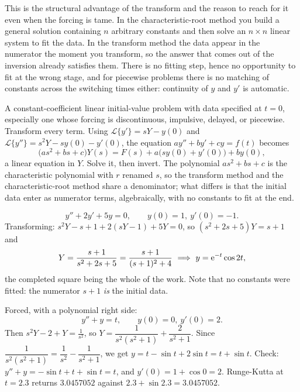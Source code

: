 \begin{keynote}
This is the structural advantage of the transform and the reason to reach for it even when the forcing is tame. In the characteristic-root method you build a general solution containing $n$ arbitrary constants and then solve an $n\times n$ linear system to fit the data. In the transform method the data appear in the numerator the moment you transform, so the answer that comes out of the inversion already satisfies them. There is no fitting step, hence no opportunity to fit at the wrong stage, and for piecewise problems there is no matching of constants across the switching times either: continuity of $y$ and $y'$ is automatic.
\end{keynote}

\cue A constant-coefficient linear initial-value problem with data specified at $t=0$, especially one whose forcing is discontinuous, impulsive, delayed, or piecewise.
\method Transform every term. Using $\mathcal{L}\{y'\}=sY-y(0)$ and $\mathcal{L}\{y''\}=s^{2}Y-sy(0)-y'(0)$, the equation $ay''+by'+cy=f(t)$ becomes
\[\bigl(as^{2}+bs+c\bigr)Y(s)=F(s)+a\bigl(sy(0)+y'(0)\bigr)+by(0),\]
a linear equation in $Y$. Solve it, then invert. The polynomial $as^{2}+bs+c$ is the characteristic polynomial with $r$ renamed $s$, so the transform method and the characteristic-root method share a denominator; what differs is that the initial data enter as numerator terms, algebraically, with no constants to fit at the end.

\begin{worked}
\[y''+2y'+5y=0,\qquad y(0)=1,\ y'(0)=-1.\]
Transforming: $s^{2}Y-s+1+2(sY-1)+5Y=0$, so $(s^{2}+2s+5)Y=s+1$ and
\[Y=\frac{s+1}{s^{2}+2s+5}=\frac{s+1}{(s+1)^{2}+4}\ \Longrightarrow\ y=\eu^{-t}\cos2t,\]
the completed square being the whole of the work. Note that no constants were fitted: the numerator $s+1$ \emph{is} the initial data.

Forced, with a polynomial right side:
\[y''+y=t,\qquad y(0)=0,\ y'(0)=2.\]
Then $s^{2}Y-2+Y=\tfrac1{s^{2}}$, so $Y=\dfrac{1}{s^{2}(s^{2}+1)}+\dfrac{2}{s^{2}+1}$. Since $\dfrac{1}{s^{2}(s^{2}+1)}=\dfrac1{s^{2}}-\dfrac1{s^{2}+1}$, we get $y=t-\sin t+2\sin t=t+\sin t$. Check: $y''+y=-\sin t+t+\sin t=t$, and $y'(0)=1+\cos0=2$. Runge-Kutta at $t=2.3$ returns $3.0457052$ against $2.3+\sin2.3=3.0457052$.
\end{worked}

